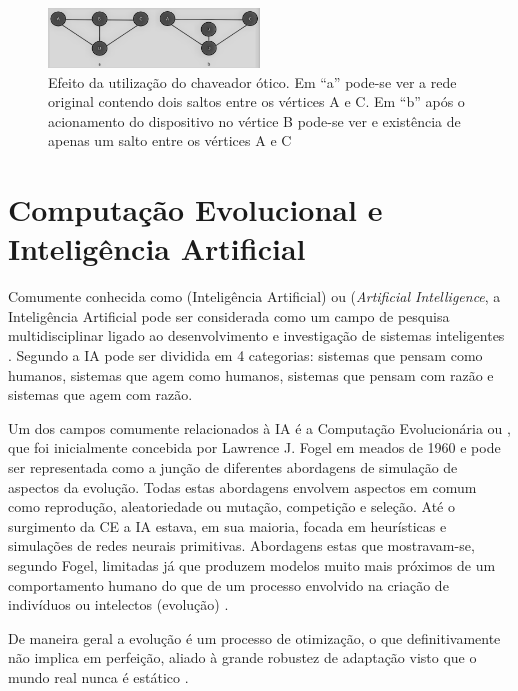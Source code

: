 \begin{figure} %
	\centering
	\includegraphics[width=0.5\textwidth]{./figuras/Bypass-exemplo-PB.png}
	\caption[Exemplo de atuação de \emph{by-pass} óptico]{Efeito da utilização do chaveador ótico. Em ``a'' pode-se ver a rede original contendo dois saltos entre os vértices A e C. Em ``b'' após o acionamento do dispositivo no vértice B pode-se ver e existência de apenas um salto entre os vértices A e C}
	\label{fig-bypass-exemplo}
\end{figure}

\section{Computação Evolucional e Inteligência Artificial}
Comumente conhecida como  (Inteligência Artificial) ou  (\emph{Artificial Intelligence}, a Inteligência Artificial pode ser considerada como um campo de pesquisa multidisciplinar ligado ao desenvolvimento e investigação de sistemas inteligentes \cite{Book-Brownlee2011}. Segundo \cite{Book-Russel2009} a IA pode ser dividida em 4 categorias: sistemas que pensam como humanos, sistemas que agem como humanos, sistemas que pensam com razão e sistemas que agem com razão.

Um dos campos comumente relacionados à IA é a Computação Evolucionária ou , que foi inicialmente concebida por Lawrence J. Fogel em meados de 1960 e pode ser representada como a junção de diferentes abordagens de simulação de aspectos da evolução. Todas estas abordagens envolvem aspectos em comum como reprodução, aleatoriedade ou mutação, competição e seleção. Até o surgimento da CE a IA estava, em sua maioria, focada em heurísticas e simulações de redes neurais primitivas. Abordagens estas que mostravam-se, segundo Fogel, limitadas já que produzem modelos muito mais próximos de um comportamento humano do que de um processo envolvido na criação de indivíduos ou intelectos (evolução) \cite{Book-Back2000}.

De maneira geral a evolução é um processo de otimização, o que definitivamente não implica em perfeição, aliado à grande robustez de adaptação visto que o mundo real nunca é estático \cite{Book-Back2000}.

